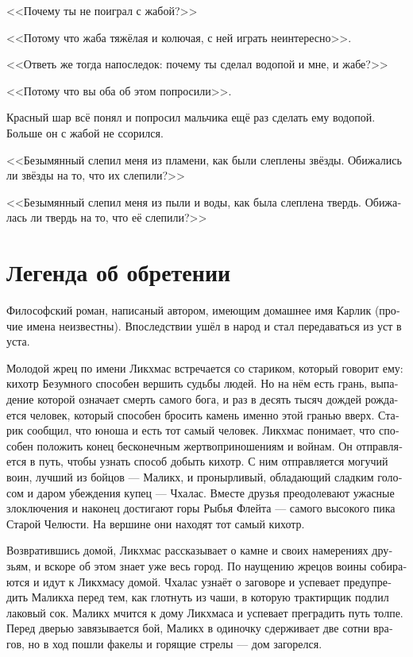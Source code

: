 \documentclass[a4paper,12pt,fleqn]{book}\usepackage{polyglossia}\setdefaultlanguage[babelshorthands=true]{russian}\setotherlanguage{english}\defaultfontfeatures{Ligatures=TeX,Mapping=tex-text}\usepackage{xcolor}\newcommand{\ml}[3]{#2}
\newcommand{\textspace}{\vspace{1em}{\centering\Large\bfseries<...>\par}\vspace{1em}}
\begin{document}
{<<Почему ты не поиграл с жабой?>>

<<Потому что жаба тяжёлая и колючая, с ней играть неинтересно>>.

<<Ответь же тогда напоследок: почему ты сделал водопой и мне, и жабе?>>

<<Потому что вы оба об этом попросили>>.

Красный шар всё понял и попросил мальчика ещё раз сделать ему водопой.
Больше он с жабой не ссорился.

\textspace

<<Безымянный слепил меня из пламени, как были слеплены звёзды.
Обижались ли звёзды на то, что их слепили?>>

<<Безымянный слепил меня из пыли и воды, как была слеплена твердь.
Обижалась ли твердь на то, что её слепили?>>


\section{Легенда об обретении}

Философский роман, написаный автором, имеющим домашнее имя Карлик (прочие имена неизвестны).
Впоследствии ушёл в народ и стал передаваться из уст в уста.

Молодой жрец по имени Ликхмас встречается со стариком, который говорит ему: кихотр Безумного способен вершить судьбы людей.
Но на нём есть грань, выпадение которой означает смерть самого бога, и раз в десять тысяч дождей рождается человек, который способен бросить камень именно этой гранью вверх.
Старик сообщил, что юноша и есть тот самый человек.
Ликхмас понимает, что способен положить конец бесконечным жертвоприношениям и войнам.
Он отправляется в путь, чтобы узнать способ добыть кихотр.
С ним отправляется могучий воин, лучший из бойцов --- Маликх, и пронырливый, обладающий сладким голосом и даром убеждения купец --- Чхалас.
Вместе друзья преодолевают ужасные злоключения и наконец достигают горы Рыбья Флейта --- самого высокого пика Старой Челюсти.
На вершине они находят тот самый кихотр.

Возвратившись домой, Ликхмас рассказывает о камне и своих намерениях друзьям, и вскоре об этом знает уже весь город.
По наущению жрецов воины собираются и идут к Ликхмасу домой.
Чхалас узнаёт о заговоре и успевает предупредить Маликха перед тем, как глотнуть из чаши, в которую трактирщик подлил лаковый сок.
Маликх мчится к дому Ликхмаса и успевает преградить путь толпе.
Перед дверью завязывается бой, Маликх в одиночку сдерживает две сотни врагов, но в ход пошли факелы и горящие стрелы --- дом загорелся.

}
\end{document}
